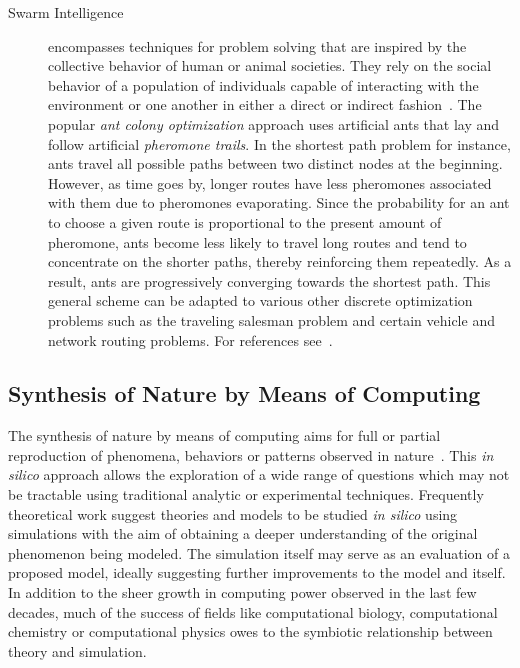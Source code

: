 \begin{description}
			\item[Swarm Intelligence] encompasses techniques for problem solving that are inspired by the collective behavior of human or animal societies. They rely on the social behavior of a population of individuals capable of interacting with the environment or one another in either a direct or indirect fashion~\cite{de2007fundamentals}. The popular \emph{ant colony optimization} approach uses artificial ants that lay and follow artificial \emph{pheromone trails}. In the shortest path problem for instance, ants travel all possible paths between two distinct nodes at the beginning. However, as time goes by, longer routes have less pheromones associated with them due to pheromones evaporating. Since the probability for an ant to choose a given route is proportional to the present amount of pheromone, ants become less likely to travel long routes and tend to concentrate on the shorter paths, thereby reinforcing them repeatedly. As a result, ants are progressively converging towards the shortest path. This general scheme can be adapted to various other discrete optimization problems such as the traveling salesman problem and certain vehicle and network routing problems. For references see~\cite{bonabeau2000swarm,bonabeau2000inspiration,Bonabeau:1999:SIN:328320,fukuyama2008fundamentals}.
			
		\end{description}

		\FloatBarrier

	\subsection{Synthesis of Nature by Means of Computing}
		
		The synthesis of nature by means of computing aims for full or partial reproduction of phenomena, behaviors or patterns observed in nature~\cite{de2007fundamentals}. This \emph{in silico} approach allows the exploration of a wide range of questions which may not be tractable using traditional analytic or experimental techniques. Frequently theoretical work suggest theories and models to be studied \emph{in silico} using simulations with the aim of obtaining a deeper understanding of the original phenomenon being modeled. The simulation itself may serve as an evaluation of a proposed model, ideally suggesting further improvements to the model and itself. In addition to the sheer growth in computing power observed in the last few decades, much of the success of fields like computational biology, computational chemistry or computational physics owes to the symbiotic relationship between theory and simulation.

